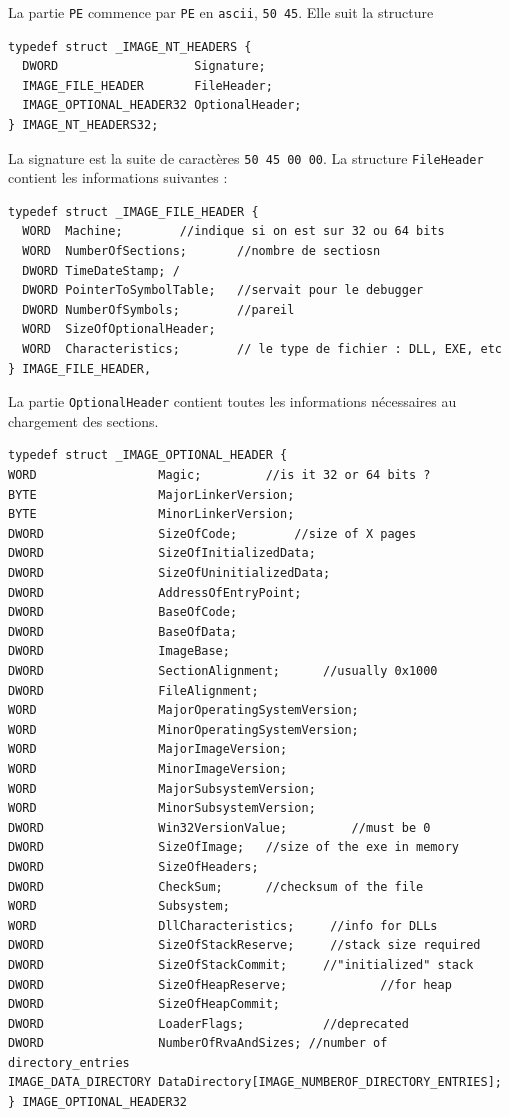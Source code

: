 \documentclass{book}
\newcommand{\code}[1]{\texttt{#1}}
\begin{document}
La partie \code{PE} commence par \code{PE} en \code{ascii}, \code{50 45}. Elle suit la structure 
\begin{verbatim}
typedef struct _IMAGE_NT_HEADERS {
  DWORD                   Signature;
  IMAGE_FILE_HEADER       FileHeader;
  IMAGE_OPTIONAL_HEADER32 OptionalHeader;
} IMAGE_NT_HEADERS32;
\end{verbatim} 

La signature est la suite de caractères \code{50 45 00 00}. La structure \code{FileHeader} contient les informations suivantes : 

\begin{verbatim}
typedef struct _IMAGE_FILE_HEADER {
  WORD  Machine;		//indique si on est sur 32 ou 64 bits
  WORD  NumberOfSections;       //nombre de sectiosn
  DWORD TimeDateStamp; /
  DWORD PointerToSymbolTable;   //servait pour le debugger
  DWORD NumberOfSymbols;        //pareil
  WORD  SizeOfOptionalHeader;
  WORD  Characteristics;        // le type de fichier : DLL, EXE, etc
} IMAGE_FILE_HEADER,
\end{verbatim}

La partie \code{OptionalHeader} contient toutes les informations nécessaires au chargement des sections. 

\begin{verbatim}
typedef struct _IMAGE_OPTIONAL_HEADER {
WORD                 Magic;		    //is it 32 or 64 bits ?
BYTE                 MajorLinkerVersion;
BYTE                 MinorLinkerVersion;
DWORD                SizeOfCode;	   	//size of X pages
DWORD                SizeOfInitializedData;
DWORD                SizeOfUninitializedData;
DWORD                AddressOfEntryPoint;
DWORD                BaseOfCode;
DWORD                BaseOfData;
DWORD                ImageBase;
DWORD                SectionAlignment;    	//usually 0x1000
DWORD                FileAlignment;
WORD                 MajorOperatingSystemVersion;
WORD                 MinorOperatingSystemVersion;
WORD                 MajorImageVersion;
WORD                 MinorImageVersion;
WORD                 MajorSubsystemVersion;
WORD                 MinorSubsystemVersion;
DWORD                Win32VersionValue;		    //must be 0
DWORD                SizeOfImage;  	//size of the exe in memory
DWORD                SizeOfHeaders;
DWORD                CheckSum;	  	//checksum of the file
WORD                 Subsystem;
WORD                 DllCharacteristics;	 //info for DLLs
DWORD                SizeOfStackReserve;	 //stack size required
DWORD                SizeOfStackCommit;  	//"initialized" stack
DWORD                SizeOfHeapReserve;     		//for heap
DWORD                SizeOfHeapCommit;
DWORD                LoaderFlags;			//deprecated
DWORD                NumberOfRvaAndSizes; //number of directory_entries
IMAGE_DATA_DIRECTORY DataDirectory[IMAGE_NUMBEROF_DIRECTORY_ENTRIES];
} IMAGE_OPTIONAL_HEADER32
\end{verbatim}
\end{document}
